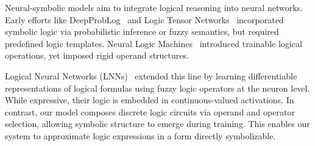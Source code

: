 Neural-symbolic models aim to integrate logical reasoning into neural networks. Early efforts like DeepProbLog~\cite{manhaeve2018deepproblog} and Logic Tensor Networks~\cite{serafini2016logic} incorporated symbolic logic via probabilistic inference or fuzzy semantics, but required predefined logic templates. Neural Logic Machines~\cite{dong2019nlm} introduced trainable logical operations, yet imposed rigid operand structures.

Logical Neural Networks (LNNs)~\cite{riegel2020lnn} extended this line by learning differentiable representations of logical formulas using fuzzy logic operators at the neuron level. While expressive, their logic is embedded in continuous-valued activations. In contrast, our model composes discrete logic circuits via operand and operator selection, allowing symbolic structure to emerge during training. This enables our system to approximate logic expressions in a form directly symbolizable.
